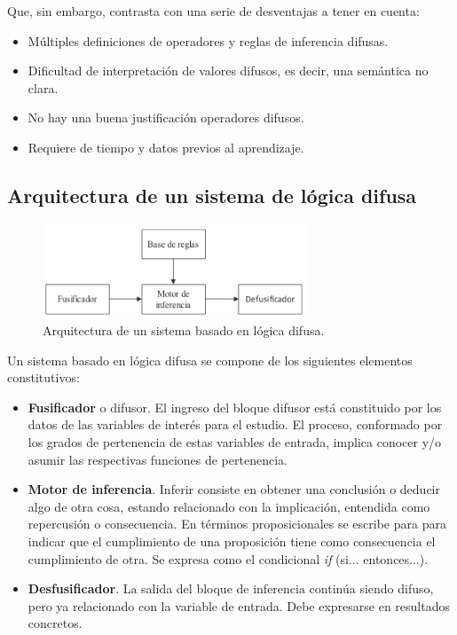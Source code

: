 \documentclass[a4paper, 11pt, titlepage]{article}
\begin{document}
    Que, sin embargo, contrasta con una serie de desventajas a tener en cuenta:

    \begin{itemize}
        \item Múltiples definiciones de operadores y reglas de inferencia difusas.
        \item Dificultad de interpretación de valores difusos, es decir, una semántica no clara.
        \item No hay una buena justificación operadores difusos.
        \item Requiere de tiempo y datos previos al aprendizaje.
    \end{itemize}

    \subsection{Arquitectura de un sistema de lógica difusa}

        \begin{figure}[htp]
            \centering
            \includegraphics[width=0.7\textwidth]{resources/logicadifusa.png}
            \caption{Arquitectura de un sistema basado en lógica difusa.}
            \label{logicadifusa}
        \end{figure}

        Un sistema basado en lógica difusa se compone de los siguientes elementos constitutivos:

        \begin{itemize}
            \item \textbf{Fusificador} o difusor. El ingreso del bloque difusor está constituido por los 
            datos de las variables de interés para el estudio. El proceso, conformado por 
            los grados de pertenencia de estas variables de entrada, implica conocer y/o 
            asumir las respectivas funciones de pertenencia.
            \item \textbf{Motor de inferencia}. Inferir consiste en obtener una conclusión 
            o deducir algo de otra cosa, estando relacionado con la implicación, entendida como 
            repercusión o consecuencia. En términos proposicionales se escribe para para indicar 
            que el cumplimiento de una proposición tiene como consecuencia el cumplimiento de otra.
            Se expresa como el condicional \textit{if} (si... entonces...).
            \item \textbf{Desfusificador}. La salida del bloque de inferencia continúa siendo difuso,
            pero ya relacionado con la variable de entrada. Debe expresarse en resultados concretos.
        \end{itemize}
\end{document}
